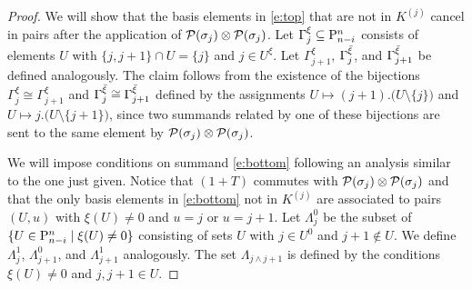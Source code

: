 \begin{proof}
	We will show that the basis elements in \eqref{e:top} that are not in $K^{(j)}$ cancel in pairs after the application of $\cP(\sigma_j) \ot \cP(\sigma_j)$.
	Let $\Gamma_j^\xi \subseteq \P_{n-i}^n$ consists of elements $U$ with $\{j, j+1\} \cap U = \{j\}$ and $j \in U^\xi$.
	Let $\Gamma_{j+1}^\xi$, $\Gamma_j^\barxi$, and $\Gamma_{j+1}^\barxi$ be defined analogously.
	The claim follows from the existence of the bijections $\Gamma_{j}^\xi \cong \Gamma_{j+1}^\xi$ and $\Gamma_{j}^\barxi \cong \Gamma_{j+1}^\barxi$ defined by the assignments $U \mapsto (j+1).\big( U \setminus \{j\} \big)$ and $U \mapsto j.\big( U \setminus \{j+1\} \big)$, since two summands related by one of these bijections are sent to the same element by $\cP(\sigma_j) \ot \cP(\sigma_j)$.

	We will impose conditions on summand \eqref{e:bottom} following an analysis similar to the one just given.
	Notice that $(1+T)$ commutes with $\cP(\sigma_j) \ot \cP(\sigma_j)$ and that the only basis elements in \eqref{e:bottom} not in $K^{(j)}$ are associated to pairs $(U, u)$ with $\xi(U) \neq 0$ and $u = j$ or $ u = j+1$.
	Let $\Lambda_{j}^0$ be the subset of $\{U \in \P_{n-i}^n \mid \xi(U) \neq 0\}$ consisting of sets $U$ with $j \in U^0$ and $j+1 \notin U$.
	We define $\Lambda_{j}^1$, $\Lambda_{j+1}^0$, and $\Lambda_{j+1}^1$ analogously.
	The set $\Lambda_{j \wedge j+1}$ is defined by the conditions $\xi(U) \neq 0$ and $j,j+1 \in U$.


\end{proof}
